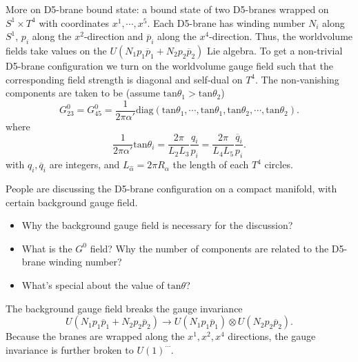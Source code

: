 More on D5-brane bound state:
a bound state of two D5-branes
wrapped on $S^1\times T^4$
with coordinates $x^1,\cdots,x^5$.
Each D5-brane has winding number $N_i$ along $S^1$,
$p_i$ along the $x^2$-direction
and $\overline{p}_i$ along the $x^4$-direction.
Thus, the worldvolume fields take values on the
$U(N_1 p_1 \overline{p}_1 + N_2 p_2 \overline{p}_2)$ Lie algebra.
To get a non-trivial D5-brane configuration
we turn on the worldvolume gauge field
such that the corresponding field strength is diagonal
and self-dual on $T^4$.
The non-vanishing components are taken to be
(assume $\mathrm{tan}\theta_1 > \mathrm{tan}\theta_2$)
\[
	G^0_{23} = G^0_{45} = \frac{1}{2 \pi \alpha'} 
	 \mathrm{diag} \left( \mathrm{tan}\theta_1,\cdots,\mathrm{tan}\theta_1,
	 \mathrm{tan}\theta_2,\cdots,\mathrm{tan}\theta_2\right)  
.\] 
where
\[
\frac{1}{2\pi \alpha'} \mathrm{tan} \theta_i
=\frac{2\pi}{L_2 L_3} \frac{q_i}{p_i} 
= \frac{2\pi}{L_4 L_5} \frac{\overline{q}_i}{p_i}
.\] 
with $q_i,\overline{q}_i$ are integers,
and $L_{\hat{\alpha}} = 2 \pi R_{\hat{\alpha}}$ the length of each $T^4$ circles.

\begin{question}
People are discussing the D5-brane configuration on a compact manifold,
with certain background gauge field.
\begin{itemize}
	\item Why the background gauge field is necessary for the discussion?
	\item What is the $G^0$ field? 
		Why the number of components are related to the D5-brane winding number?
	\item What's special about the value of $\mathrm{tan}\theta$?
\end{itemize}
\end{question}

The background gauge field breaks the gauge invariance
\[
U(N_1 p_1 \overline{p}_1 + N_2 p_2 \overline{p}_2) 
\to U(N_1 p_1 \overline{p}_1) \otimes U(N_2 p_2 \overline{p}_2)
.\] 
Because the branes are wrapped along the $x^1,x^2,x^4$ directions,
the gauge invariance is further broken to $U(1)^{\cdots}$.

